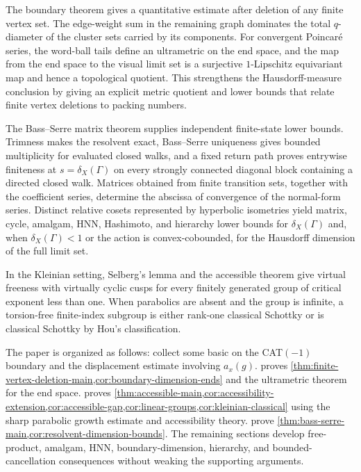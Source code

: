 \documentclass[11pt]{article}
\theoremstyle{definition}
\begin{document}
The boundary theorem gives a quantitative estimate after deletion of any finite vertex set.
The edge-weight sum in the remaining graph dominates the total $q$-diameter of the cluster
sets carried by its components.  For convergent Poincar\'e series, the word-ball tails define
an ultrametric on the end space, and the map from the end space to the visual limit set is a
surjective $1$-Lipschitz equivariant map and hence a topological quotient.  This strengthens
the Hausdorff-measure conclusion by giving an explicit metric quotient and lower bounds that
relate finite vertex deletions to packing numbers.

The Bass--Serre matrix theorem supplies independent finite-state lower bounds.  Trimness
makes the resolvent exact, Bass--Serre uniqueness gives bounded multiplicity for evaluated
closed walks, and a fixed return path proves entrywise finiteness at
$s=\delta_X(\Gamma)$ on every strongly connected diagonal block containing a directed closed
walk.  Matrices obtained from finite transition sets, together with the coefficient series, determine
the abscissa of convergence of the normal-form series.  Distinct relative cosets represented by hyperbolic isometries
yield matrix, cycle, amalgam, HNN, Hashimoto, and hierarchy lower bounds for
$\delta_X(\Gamma)$ and, when $\delta_X(\Gamma)<1$ or the action is convex-cobounded, for the
Hausdorff dimension of the full limit set.

In the Kleinian setting, Selberg's lemma and the accessible theorem give virtual freeness with
virtually cyclic cusps for every finitely generated group of critical exponent less than one.
When parabolics are absent and the group is infinite, a torsion-free finite-index subgroup is
either rank-one classical Schottky or is classical Schottky by Hou's classification.  

The paper is organized as follows:
 collect some basic on the CAT$(-1)$ boundary and the displacement estimate involving $a_x(g)$.
 proves \cref{thm:finite-vertex-deletion-main,cor:boundary-dimension-ends}
and the ultrametric theorem for the end space.   proves
\cref{thm:accessible-main,cor:accessibility-extension,cor:accessible-gap,cor:linear-groups,cor:kleinian-classical}
using the sharp parabolic growth estimate and accessibility theory.
 prove
\cref{thm:bass-serre-main,cor:resolvent-dimension-bounds}.  The remaining sections
develop free-product, amalgam, HNN, boundary-dimension, hierarchy, and bounded-cancellation
consequences without weaking the supporting arguments.
\end{document}
